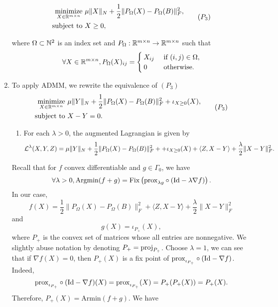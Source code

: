 \begin{enumerate}
        \begin{equation}
          \begin{aligned}
            \operatorname*{minimize}\limits_{X\in{\mathbb{R}}^{m\times n}} & \,\, \mu\|X\|_N + \dfrac{1}{2}\|P_{\Omega}(X) - P_{\Omega}(B)\|_F^2, \\
            \mathrm{subject \,\, to}               & \,\, X\ge 0,
          \end{aligned}
          \tag{$P_3$}
        \end{equation}

        where $\Omega\subset{\mathbb{N}}^2$ is an index set and $P_\Omega:{\mathbb{R}}^{m\times n}\to {\mathbb{R}}^{m\times n}$ such that
        $$\forall X\in{\mathbb{R}}^{m\times n}, P_{\Omega}(X)_{ij} = \begin{cases}
            X_{ij} & \text{ if } (i,j) \in \Omega, \\
            0      & \text{ otherwise}.
          \end{cases}$$
  \item To apply ADMM, we rewrite the equivalence of $(P_3)$
        \begin{equation}
          \begin{aligned}
            \operatorname*{minimize}\limits_{X\in{\mathbb{R}}^{m\times n}} & \,\, \mu\|Y\|_N + \dfrac{1}{2}\|P_{\Omega}(X) - P_{\Omega}(B)\|_F^2 + \iota_{X\ge 0} (X), \\
            \mathrm{subject \,\, to}               & \,\, X - Y = 0.
          \end{aligned}
          \tag{$P_3$}
        \end{equation}
        \begin{enumerate}[label = (\alph*)]
          \item For each $\lambda > 0$, the augmented Lagrangian is given by
                $$\mathcal{L}^\lambda(X,Y,Z) =  \mu\|Y\|_N + \dfrac{1}{2}\|P_{\Omega}(X) - P_{\Omega}(B)\|_F^2 + + \iota_{X\ge 0} (X) + \langle Z, X-Y\rangle + \dfrac{\lambda}{2}\|X-Y\|_F^2.$$

        \end{enumerate}
        Recall that for $f$ convex differentiable and $g\in \Gamma_0$, we have
        $$\forall\lambda > 0, \mathrm{Argmin}(f+g) = \mathrm{Fix}\left(\mathrm{prox}_{\lambda g}\circ (\mathrm{Id} - \lambda\nabla f)\right).$$
        In our case, $$f(X) = \dfrac{1}{2}\|P_{\Omega}(X) - P_{\Omega}(B)\|_F^2 + \langle Z, X-Y\rangle + \dfrac{\lambda}{2}\|X-Y\|_F^2$$
        and $$g(X) = \iota_{P_+} (X),$$
        where $P_+$ is the convex set of matrices whose all entries are nonnegative. We slightly abuse notation by denoting $P_+ = \mathrm{proj}_{P_+}$. Choose $\lambda = 1$, we can see that if $\nabla f(X) = 0$, then $P_+(X)$ is a fix point of $\mathrm{prox}_{\iota_{P_+}}\circ (\mathrm{Id} - \nabla f)$. Indeed,
        $$\mathrm{prox}_{\iota_{P_+}}\circ (\mathrm{Id} - \nabla f)(X) = \mathrm{prox}_{\iota_{P_+}}(X) = P_+(P_+(X)) = P_+(X).$$
        Therefore, $P_+(X) = \mathrm{Armin}(f+g)$. We have


\end{enumerate}
